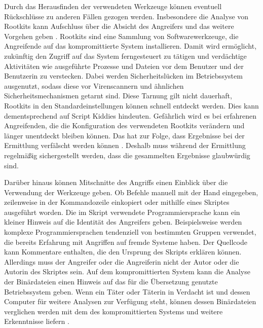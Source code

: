 \documentclass[12pt,DIV=14, version=first, BCOR=10mm,a4paper,twoside,parskip=half-,headsepline,headinclude]{scrartcl}
\begin{document}
    Durch das Herausfinden der verwendeten Werkzeuge können eventuell Rückschlüsse zu anderen Fällen gezogen werden. Insbesondere die Analyse von Rootkits kann Aufschluss über die Absicht des Angreifers und das weitere Vorgehen geben \cite[vgl. S. 73]{texbook01}. Rootkits sind eine Sammlung von Softwarewerkzeuge, die Angreifende auf das kompromittierte System installieren. Damit wird ermöglicht, zukünftig den Zugriff auf das System ferngesteuert zu tätigen und verdächtige Aktivitäten wie ausgeführte Prozesse und Dateien vor dem Benutzer und der Benutzerin zu verstecken. Dabei werden Sicherheitslücken im Betriebssystem ausgenutzt, sodass diese vor Virenscannern und ähnlichen Sicherheitsmechanismen getarnt sind. Diese Tarnung gilt nicht dauerhaft, Rootkits in den Standardeinstellungen können schnell entdeckt werden. Dies kann dementsprechend auf Script Kiddies hindeuten. Gefährlich wird es bei erfahrenen Angreifenden, die die Konfiguration des verwendeten Rootkits verändern und länger unentdeckt bleiben können. Das hat zur Folge, dass Ergebnisse bei der Ermittlung verfälscht werden können \cite[vgl. S. 70]{BSI_leitfaden}. Deshalb muss während der Ermittlung regelmäßig sichergestellt werden, dass die gesammelten Ergebnisse glaubwürdig sind.
    
    Darüber hinaus können Mitschnitte des Angriffs einen Einblick über die Verwendung der Werkzeuge geben. Ob Befehle manuell mit der Hand eingegeben, zeilenweise in der Kommandozeile einkopiert oder mithilfe eines Skriptes ausgeführt worden. Die im Skript verwendete Programmiersprache kann ein kleiner Hinweis auf die Identität des Angreifers geben. Beispielsweise werden komplexe Programmiersprachen tendenziell von bestimmten Gruppen verwendet, die bereits Erfahrung mit Angriffen auf fremde Systeme haben. Der Quellcode kann Kommentare enthalten, die den Ursprung des Skripts erklären können. Allerdings muss der Angreifer oder die Angreiferin nicht der Autor oder die Autorin des Skriptes sein. Auf dem kompromittierten System kann die Analyse der Binärdateien einen Hinweis auf das für die Übersetzung genutzte Betriebssystem geben. Wenn ein Täter oder Täterin in Verdacht ist und dessen Computer für weitere Analysen zur Verfügung steht, können dessen Binärdateien verglichen werden mit dem des kompromittierten Systems und weitere Erkenntnisse liefern \cite[vgl. S. 73-74]{texbook01}.
    
\end{document}
